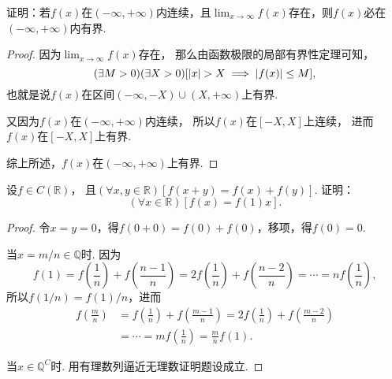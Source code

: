 \begin{example}
证明：若\(f(x)\)在\((-\infty,+\infty)\)内连续，且\(\lim_{x \to \infty}f(x)\)存在，则\(f(x)\)必在\((-\infty,+\infty)\)内有界.
\begin{proof}
因为\(\lim_{x \to \infty} f(x)\)存在，
那么由函数极限的局部有界性定理可知，\[
	(\exists M>0)
	(\exists X>0)
	[
		\abs{x} > X \implies \abs{f(x)} \leq M
	],
\]
也就是说\(f(x)\)在区间\((-\infty,-X)\cup(X,+\infty)\)上有界.

又因为\(f(x)\)在\((-\infty,+\infty)\)内连续，
所以\(f(x)\)在\([-X,X]\)上连续，
进而\(f(x)\)在\([-X,X]\)上有界.

综上所述，\(f(x)\)在\((-\infty,+\infty)\)上有界.
\end{proof}
\end{example}

\begin{example}
设\(f \in C(\mathbb{R})\)，
且\((\forall x,y\in\mathbb{R})[f(x+y) = f(x) + f(y)]\).
证明：\[
	(\forall x\in\mathbb{R})[f(x) = f(1) x].
\]
\begin{proof}
\def\f#1#2{f\left(\frac{#1}{#2}\right)}
令\(x=y=0\)，得\(f(0+0) = f(0) + f(0)\)，移项，得\(f(0) = 0\).

当\(x = m/n \in \mathbb{Q}\)时.
因为\[
	f(1) = \f{1}{n} + \f{n-1}{n}
	= 2 \f{1}{n} + \f{n-2}{n}
	= \dotsb
	= n \f{1}{n},
\]
所以\(f(1/n) = f(1) / n\)，进而\[
	\begin{split}
	\f{m}{n}
	&= \f{1}{n} + \f{m-1}{n}
	= 2 \f{1}{n} + \f{m-2}{n} \\
	&= \dotsb
	= m \f{1}{n} = \frac{m}{n} f(1).
	\end{split}
\]

当\(x \in \mathbb{Q}^C\)时.
用有理数列逼近无理数证明题设成立.
\end{proof}
\end{example}

%
%
%

